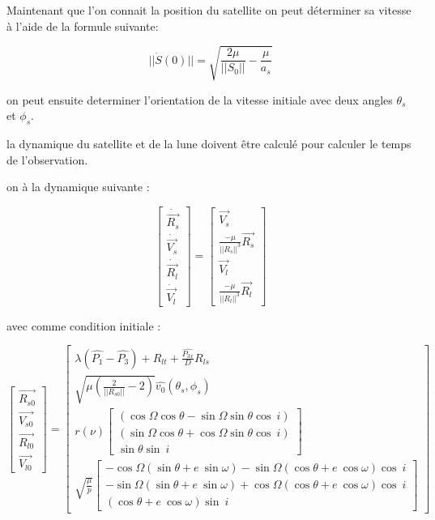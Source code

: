 \documentclass{article} %
\begin{document}
		Maintenant que l'on connait la position du satellite on peut déterminer sa vitesse à l'aide de la formule suivante:
		
		$$
		||\dot{S}(0)||=\sqrt{\frac{2\mu}{||S_0||}-\frac{\mu}{a_s}}
		$$
		
		on peut ensuite determiner l'orientation de la vitesse initiale avec deux angles $\theta_s$ et $\phi_s$.
		
		la dynamique du satellite et de la lune doivent être calculé pour calculer le temps de l'observation.
		
		on à la dynamique suivante :
		
		$$
		\begin{bmatrix}
			\dot{\overrightarrow{R_{s}}}\\
			\dot{\overrightarrow{V_{s}}}\\
			\dot{\overrightarrow{R_{l}}}\\
			\dot{\overrightarrow{V_{l}}}
		\end{bmatrix} =\begin{bmatrix}
			\overrightarrow{V_{s}}\\
			\frac{-\mu }{||R_{s} ||^{3}}\overrightarrow{R_{s}}\\
			\overrightarrow{V_{l}}\\
			\frac{-\mu }{||R_{l} ||^{3}}\overrightarrow{R_{l}}
		\end{bmatrix}
		$$
		
		avec comme condition initiale :
		
		
		$$
		\begin{bmatrix}
			\overrightarrow{R_{s0}}\\
			\overrightarrow{V_{s0}}\\
			\overrightarrow{R_{l0}}\\
			\overrightarrow{V_{l0}}
		\end{bmatrix} =\begin{bmatrix}
			\lambda \left(\widehat{P_{1}} -\widehat{P_{3}}\right) +R_{lt} +\frac{\widehat{P_{3x}}}{D} R_{ls}\\
			\sqrt{\mu \left(\frac{2}{||R_{s0} ||} -2\right)}\widehat{v_{0}}( \theta _{s} ,\phi _{s})\\
			r( \nu )\begin{bmatrix}
				( \cos\Omega \cos\theta -\sin\Omega \sin\theta \cos\ i)\\
				( \sin\Omega \cos\theta +\cos\Omega \sin\theta \cos\ i)\\
				\sin\theta \sin\ i
			\end{bmatrix}\\
			\sqrt{\frac{\mu }{p}}\begin{bmatrix}
				-\cos\Omega ( \sin\theta +e\ \sin\omega ) -\sin\Omega ( \cos\theta +e\ \cos\omega ) \cos\ i\\
				-\sin\Omega ( \sin\theta +e\ \sin\omega ) +\cos\Omega ( \cos\theta +e\ \cos\omega ) \cos\ i\\
				( \cos\theta +e\ \cos\omega ) \sin\ i
			\end{bmatrix}
		\end{bmatrix}
		$$
		
\end{document}
